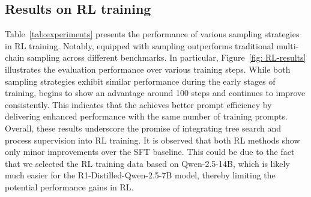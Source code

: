 \subsection{Results on RL training}
Table~\ref{tab:experiments} presents the performance of various sampling strategies in RL training. Notably, \model equipped with \treemodel sampling outperforms traditional multi-chain sampling across different benchmarks. In particular, Figure~\ref{fig: RL-results} illustrates the evaluation performance over various training steps. While both sampling strategies exhibit similar performance during the early stages of training, \model begins to show an advantage around 100 steps and continues to improve consistently. This indicates that the \model achieves better prompt efficiency by delivering enhanced performance with the same number of training prompts. Overall, these results underscore the promise of integrating tree search and process supervision into RL training. 
It is observed that both RL methods show only minor improvements over the SFT baseline. This could be due to the fact that we selected the RL training data based on Qwen-2.5-14B, which is likely much easier for the R1-Distilled-Qwen-2.5-7B model, thereby limiting the potential performance gains in RL. 







